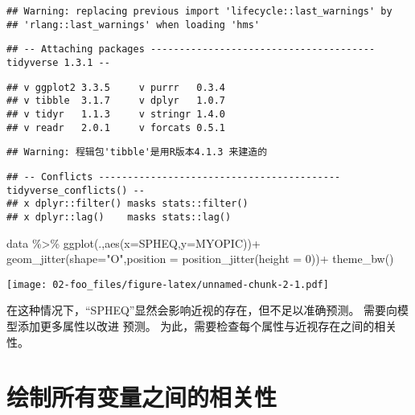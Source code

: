 \documentclass[]{ctexbook}
\newenvironment{Shaded}{\begin{snugshade}}{\end{snugshade}}
\newcommand{\AttributeTok}[1]{\textcolor[rgb]{0.77,0.63,0.00}{#1}}
\newcommand{\DecValTok}[1]{\textcolor[rgb]{0.00,0.00,0.81}{#1}}
\newcommand{\FunctionTok}[1]{\textcolor[rgb]{0.00,0.00,0.00}{#1}}
\newcommand{\NormalTok}[1]{#1}
\newcommand{\SpecialCharTok}[1]{\textcolor[rgb]{0.00,0.00,0.00}{#1}}
\newcommand{\StringTok}[1]{\textcolor[rgb]{0.31,0.60,0.02}{#1}}
\begin{document}
\begin{verbatim}
## Warning: replacing previous import 'lifecycle::last_warnings' by
## 'rlang::last_warnings' when loading 'hms'
\end{verbatim}

\begin{verbatim}
## -- Attaching packages --------------------------------------- tidyverse 1.3.1 --
\end{verbatim}

\begin{verbatim}
## v ggplot2 3.3.5     v purrr   0.3.4
## v tibble  3.1.7     v dplyr   1.0.7
## v tidyr   1.1.3     v stringr 1.4.0
## v readr   2.0.1     v forcats 0.5.1
\end{verbatim}

\begin{verbatim}
## Warning: 程辑包'tibble'是用R版本4.1.3 来建造的
\end{verbatim}

\begin{verbatim}
## -- Conflicts ------------------------------------------ tidyverse_conflicts() --
## x dplyr::filter() masks stats::filter()
## x dplyr::lag()    masks stats::lag()
\end{verbatim}

\begin{Shaded}
\begin{Highlighting}[]
\NormalTok{data }\SpecialCharTok{\%\textgreater{}\%} 
  \FunctionTok{ggplot}\NormalTok{(.,}\FunctionTok{aes}\NormalTok{(}\AttributeTok{x=}\NormalTok{SPHEQ,}\AttributeTok{y=}\NormalTok{MYOPIC))}\SpecialCharTok{+}
  \FunctionTok{geom\_jitter}\NormalTok{(}\AttributeTok{shape=}\StringTok{"O"}\NormalTok{,}\AttributeTok{position =} \FunctionTok{position\_jitter}\NormalTok{(}\AttributeTok{height =} \DecValTok{0}\NormalTok{))}\SpecialCharTok{+}
  \FunctionTok{theme\_bw}\NormalTok{()}
\end{Highlighting}
\end{Shaded}

\texttt{[image: 02-foo\_files/figure-latex/unnamed-chunk-2-1.pdf]}

在这种情况下，``SPHEQ''显然会影响近视的存在，但不足以准确预测。 需要向模型添加更多属性以改进
预测。 为此，需要检查每个属性与近视存在之间的相关性。

\hypertarget{ux7ed8ux5236ux6240ux6709ux53d8ux91cfux4e4bux95f4ux7684ux76f8ux5173ux6027}{%
\section{绘制所有变量之间的相关性}\label{ux7ed8ux5236ux6240ux6709ux53d8ux91cfux4e4bux95f4ux7684ux76f8ux5173ux6027}}
\end{document}
